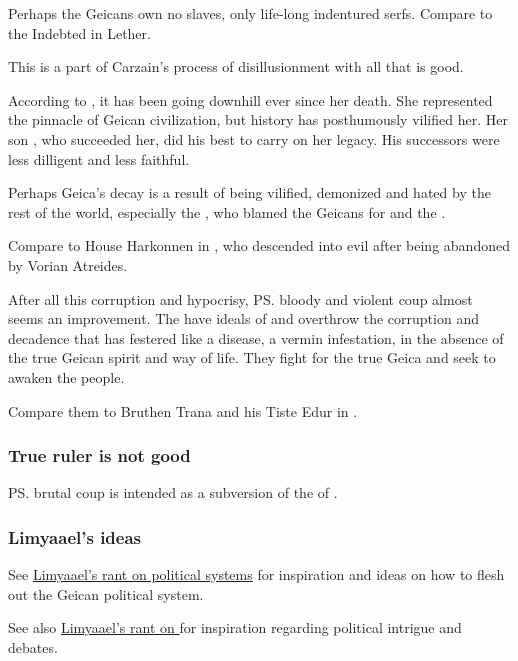 Perhaps the Geicans own no slaves, only life-long indentured serfs. Compare to the Indebted in Lether. 

This is a part of Carzain's process of disillusionment with all that is good. 

According to \Belzir, it has been going downhill ever since her death. She represented the pinnacle of Geican civilization, but history has posthumously vilified her. Her son , who succeeded her, did his best to carry on her legacy. His successors were less dilligent and less faithful. 

Perhaps Geica's decay is a result of being vilified, demonized and hated by the rest of the world, especially the , who blamed the Geicans for \Belzir{} and the . 

Compare to House Harkonnen in , who descended into evil after being abandoned by Vorian Atreides. 

After all this corruption and hypocrisy, \ps{\Belzir}{} bloody and violent coup almost seems an improvement. The  have ideals of  and overthrow the corruption and decadence that has festered like a disease, a vermin infestation, in the absence of the true Geican spirit and way of life. They fight for the true Geica and seek to awaken the people. 

Compare them to Bruthen Trana and his Tiste Edur in \MalazanReapersGale. 





\subsubsection{True ruler is not good}
\ps{\Belzir} brutal coup is intended as a subversion of the \cliche{} of . 





\subsubsection{Limyaael's ideas}
See \href{http://limyaael.insanejournal.com/205202.html}{Limyaael's rant on political systems} for inspiration and ideas on how to flesh out the Geican political system. 

See also \href{http://limyaael.insanejournal.com/205202.html}{Limyaael's rant on } for inspiration regarding political intrigue and debates. 







